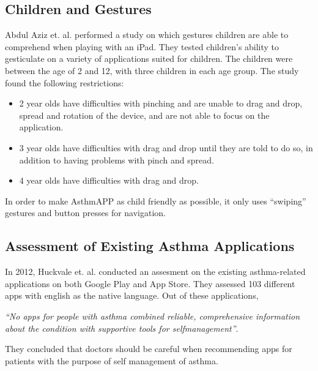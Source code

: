 \subsection{Children and Gestures}
\label{sec:childrenandgestures}
Abdul Aziz et. al.\cite{aziz2013children} performed a study on which gestures children are able to comprehend when playing with an iPad. They tested children's ability to gesticulate on a variety of applications suited for children. The children were between the age of 2 and 12, with three children in each age group. The study found the following restrictions:

\begin{itemize}
  \item 2 year olds have difficulties with pinching and are unable to drag and drop, spread and rotation of the device, and are not able to focus on the application. 
  \item 3 year olds have difficulties with drag and drop until they are told to do so, in addition to having problems with pinch and spread. 
  \item 4 year olds have difficulties with drag and drop. 
\end{itemize}

In order to make AsthmAPP as child friendly as possible, it only uses ``swiping'' gestures and button presses for navigation.


\subsection{Assessment of Existing Asthma Applications}
In 2012, Huckvale et. al.\cite{huckvale2012apps} conducted an assesment on the existing asthma-related applications on both Google Play and App Store. They assessed 103 different apps with english as the native language. Out of these applications, 

\emph{``No apps for people with asthma combined reliable, comprehensive information about the condition with supportive tools for self­management''}\cite{huckvale2012apps}. 

They concluded that doctors should be careful when recommending apps for patients with the purpose of self management of asthma.
